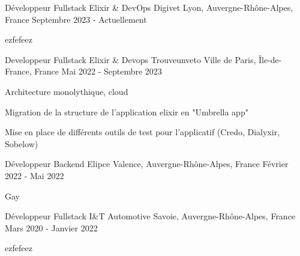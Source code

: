 
\begin{cventries}

  \cventry
    {Développeur Fullstack Elixir \& DevOps}
    {Digivet}
    {Lyon, Auvergne-Rhône-Alpes, France}
    {Septembre 2023 - Actuellement}
    {
      \begin{cvitems}
        \item {ezfefeez}
      \end{cvitems}
    }

  \cventry
    {Developpeur Fullstack Elixir \& Devops}
    {Trouveunveto}
    {Ville de Paris, Île-de-France, France}
    {Mai 2022 - Septembre 2023}
    {
      \begin{cvitems}
        \item {Architecture monolythique, cloud}
        \item {Migration de la structure de l'application elixir en "Umbrella app"}
        \item {Mise en place de différents outils de test pour l'applicatif (Credo, Dialyxir, Sobelow)}
      \end{cvitems}
    }

  \cventry
    {Développeur Backend}
    {Elipce}
    {Valence, Auvergne-Rhône-Alpes, France}
    {Février 2022 - Mai 2022}
    {
      \begin{cvitems}
        \item {Gay}
      \end{cvitems}
    }

  \cventry
    {Développeur Fullstack}
    {I\&T Automotive}
    {Savoie, Auvergne-Rhône-Alpes, France}
    {Mars 2020 - Janvier 2022}
    {
      \begin{cvitems}
        \item{ezfefeez}
      \end{cvitems}
    }

\end{cventries}
